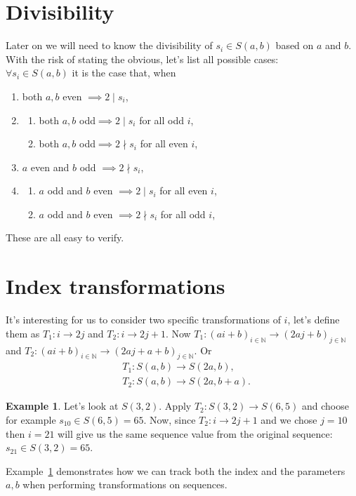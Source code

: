 \documentclass{article}
\theoremstyle{definition}
\newtheorem{example}{Example}[section]
\begin{document}
\section{Divisibility}
Later on we will need to know the divisibility of $s_i\in S(a,b)$ based on $a$ and $b$. With the risk of stating the obvious, let's list all possible cases:
%
\\[.4cm]
%
$\forall s_i \in S(a,b)$ it is the case that, when
\begin{enumerate}
    \item
    both $a,b$ even $ \implies 2\mid s_i$,
    \item
    \begin{enumerate}
        \item
        both $a,b$ odd$\implies 2\mid s_i$ for all odd $i$,
        \item
        both $a,b$ odd$\implies 2\nmid s_i$ for all even $i$,
    \end{enumerate}
    \item
    $a$ even and $b$ odd $\implies 2\nmid s_i$,
    \item
    \begin{enumerate}
        \item
        $a$ odd and $b$ even $\implies 2\mid s_i$ for all even $i$,
        \item
        $a$ odd and $b$ even $\implies 2\nmid s_i$ for all odd $i$,
    \end{enumerate}
\end{enumerate}
These are all easy to verify.

\section{Index transformations}
It's interesting for us to consider two specific transformations of $i$, let's define them as $T_1: i \longrightarrow 2j$ and $T_2: i \longrightarrow 2j+1$. Now $T_1: (ai+b)_{i\in\mathbb{N}} \longrightarrow (2aj+b)_{j\in\mathbb{N}}$ and $T_2: (ai+b)_{i\in\mathbb{N}} \longrightarrow (2aj+a+b)_{j\in\mathbb{N}}$. Or
\begin{equation*}
\begin{split}
    & T_1: S(a,b) \longrightarrow S(2a,b), \\
    & T_2: S(a,b) \longrightarrow S(2a,b+a).
\end{split}
\end{equation*}

\begin{example}\label{example:ex1}
Let's look at $S(3,2)$. Apply $T_2: S(3,2)\longrightarrow S(6,5)$ and choose for example $s_{10}\in S(6,5) = 65$. Now, since $T_2: i \longrightarrow 2j + 1$ and we chose $j=10$ then $i=21$ will give us the same sequence value from the original sequence: $s_{21}\in S(3,2) = 65$.
\end{example}
%
\noindent
Example~\ref{example:ex1} demonstrates how we can track both the index and the parameters $a,b$ when performing transformations on sequences.
\end{document}
